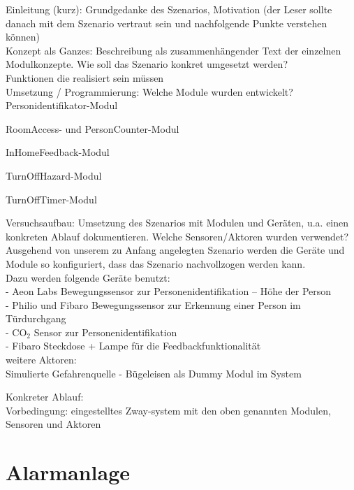 Einleitung (kurz): Grundgedanke des Szenarios, Motivation (der Leser sollte danach mit dem Szenario vertraut sein und nachfolgende Punkte verstehen können)\\

Konzept als Ganzes: Beschreibung als zusammenhängender Text der einzelnen Modulkonzepte. Wie soll das Szenario konkret umgesetzt werden?\\

Funktionen die realisiert sein müssen\\

Umsetzung / Programmierung: Welche Module wurden entwickelt?\\

Personidentifikator-Modul

RoomAccess- und PersonCounter-Modul

InHomeFeedback-Modul



TurnOffHazard-Modul



TurnOffTimer-Modul



Versuchsaufbau: Umsetzung des Szenarios mit Modulen und Geräten, u.a. einen konkreten Ablauf dokumentieren. Welche Sensoren/Aktoren wurden verwendet?\\

Ausgehend von unserem zu Anfang angelegten Szenario werden die Geräte und Module so konfiguriert, dass das Szenario nachvollzogen werden kann.\\
Dazu werden folgende Geräte benutzt:\\
- Aeon Labs Bewegungssensor zur Personenidentifikation – Höhe der Person\\
- Philio und Fibaro Bewegungssensor zur Erkennung einer Person im Türdurchgang\\
- CO$_2$ Sensor zur Personenidentifikation\\
- Fibaro Steckdose + Lampe für die Feedbackfunktionalität\\

weitere Aktoren:\\
Simulierte Gefahrenquelle - Bügeleisen als Dummy Modul im System

Konkreter Ablauf:\\

Vorbedingung: eingestelltes Zway-system mit den oben genannten Modulen, Sensoren und Aktoren

\section{Alarmanlage}
